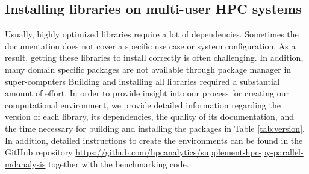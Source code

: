\subsection{Installing libraries on multi-user HPC systems}
Usually, highly optimized libraries require a lot of dependencies. 
Sometimes the documentation does not cover a specific use case or system configuration. 
As a result, getting these libraries to install correctly is often challenging.
In addition, many domain specific packages are not available through package manager in super-computers 
Building and installing all libraries required a substantial amount of effort. 
In order to provide insight into our process for creating our computational environment, we provide detailed information regarding the version of each library, its dependencies, the quality of its documentation, and the time necessary for building and installing the packages in Table \ref{tab:version}. 
In addition, detailed instructions to create the environments can be found in the GitHub repository \url{https://github.com/hpcanalytics/supplement-hpc-py-parallel-mdanalysis} together with the benchmarking code.

